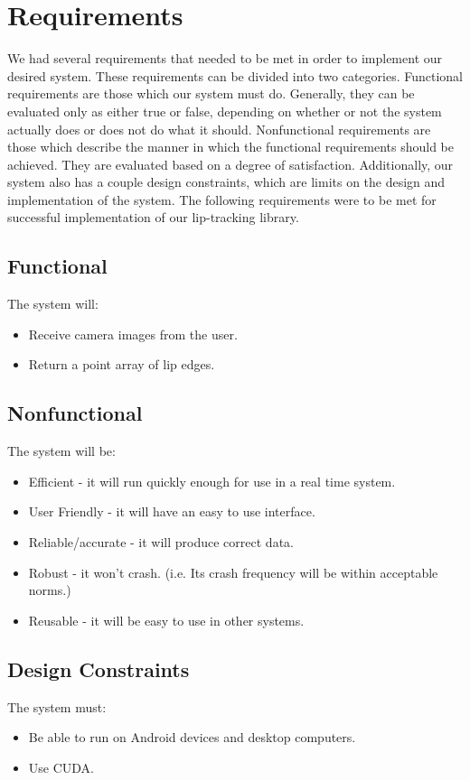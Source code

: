 \chapter{Requirements}

We had several requirements that needed to be met in order to implement our desired system. These requirements can be divided into two categories. Functional requirements are those which our system must do. Generally, they can be evaluated only as either true or false, depending on whether or not the system actually does or does not do what it should. Nonfunctional requirements are those which describe the manner in which the functional requirements should be achieved. They are evaluated based on a degree of satisfaction. Additionally, our system also has a couple design constraints, which are limits on the design and implementation of the system. The following requirements were to be met for successful implementation of our lip-tracking library.

\section{Functional}
The system will:
\begin{itemize}
\item Receive camera images from the user.
\item Return a point array of lip edges.
\end{itemize}


\section{Nonfunctional}
The system will be:
\begin{itemize}
\item Efficient - it will run quickly enough for use in a real time system.
\item User Friendly - it will have an easy to use interface.
\item Reliable/accurate - it will produce correct data.
\item Robust - it won't crash. (i.e. Its crash frequency will be within acceptable norms.)
\item Reusable - it will be easy to use in other systems.
\end{itemize}


\section{Design Constraints}
The system must:
\begin{itemize}
\item Be able to run on Android devices and desktop computers.
\item Use CUDA.
\end{itemize}